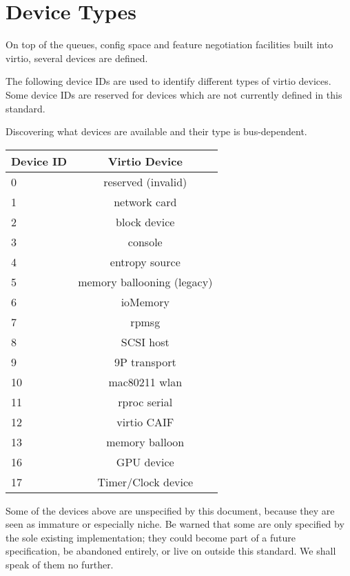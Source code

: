 \chapter{Device Types}\label{sec:Device Types}

On top of the queues, config space and feature negotiation facilities
built into virtio, several devices are defined.

The following device IDs are used to identify different types of virtio
devices.  Some device IDs are reserved for devices which are not currently
defined in this standard.

Discovering what devices are available and their type is bus-dependent.

\begin{tabular} { |l|c| }
\hline
Device ID  &  Virtio Device    \\
\hline \hline
0          & reserved (invalid) \\
\hline
1          &   network card     \\
\hline
2          &   block device     \\
\hline
3          &      console       \\
\hline
4          &  entropy source    \\
\hline
5          & memory ballooning (legacy)  \\
\hline
6          &     ioMemory       \\
\hline
7          &       rpmsg        \\
\hline
8          &     SCSI host      \\
\hline
9          &   9P transport     \\
\hline
10         &   mac80211 wlan    \\
\hline
11         &   rproc serial     \\
\hline
12         &   virtio CAIF      \\
\hline
13         &  memory balloon    \\
\hline
16         &   GPU device       \\
\hline
17         &   Timer/Clock device \\
\hline
\end{tabular}

Some of the devices above are unspecified by this document,
because they are seen as immature or especially niche.  Be warned
that some are only specified by the sole existing implementation;
they could become part of a future specification, be abandoned
entirely, or live on outside this standard.  We shall speak of
them no further.

